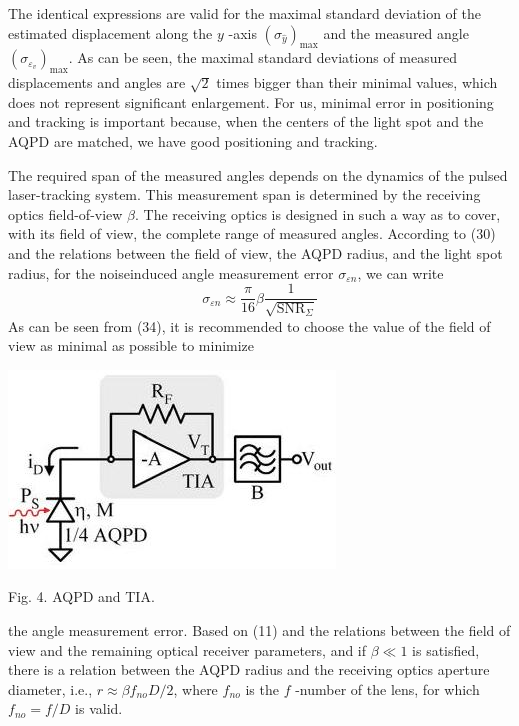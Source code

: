 \documentclass[10pt]{article}
\begin{document}
The identical expressions are valid for the maximal standard deviation of the estimated displacement along the \(y\) -axis \(\left(\sigma_{\hat{y}}\right)_{\max }\) and the measured angle \(\left(\sigma_{\varepsilon_{v}}\right)_{\max } .\) As can be seen, the maximal standard deviations of measured displacements and angles are \(\sqrt{2}\) times bigger than their minimal values, which does not represent significant enlargement. For us, minimal error in positioning and tracking is important because, when the centers of the light spot and the AQPD are matched, we have good positioning and tracking.

The required span of the measured angles depends on the dynamics of the pulsed laser-tracking system. This measurement span is determined by the receiving optics field-of-view \(\beta\). The receiving optics is designed in such a way as to cover, with its field of view, the complete range of measured angles. According to (30) and the relations between the field of view, the AQPD radius, and the light spot radius, for the noiseinduced angle measurement error \(\sigma_{\varepsilon n}\), we can write
\[
\sigma_{\varepsilon n} \approx \frac{\pi}{16} \beta \frac{1}{\sqrt{\mathrm{SNR}_{\Sigma}}}
\]
As can be seen from (34), it is recommended to choose the value of the field of view as minimal as possible to minimize

\includegraphics[max width=\textwidth]{5ecfdecb1168916efbeaf9054b715324-06}

Fig. 4. AQPD and TIA.

the angle measurement error. Based on (11) and the relations between the field of view and the remaining optical receiver parameters, and if \(\beta \ll 1\) is satisfied, there is a relation between the AQPD radius and the receiving optics aperture diameter, i.e., \(r \approx \beta f_{n o} D / 2\), where \(f_{n o}\) is the \(f\) -number of the lens, for which \(f_{n o}=f / D\) is valid.
\end{document}
